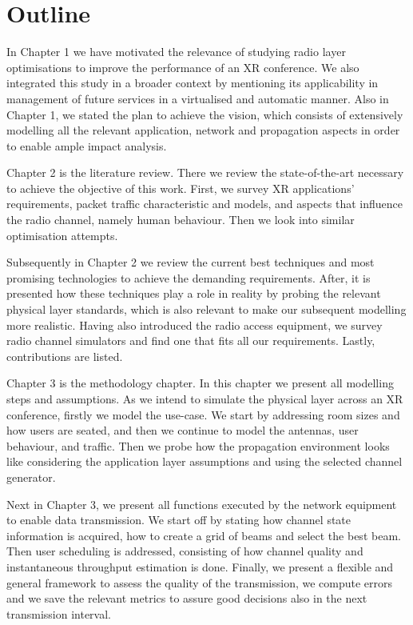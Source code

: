\section{Outline}
\label{sec:outline}

In Chapter 1 we have motivated the relevance of studying radio layer optimisations to improve the performance of an \ac{XR} conference. We also integrated this study in a broader context by mentioning its applicability in management of future services in a virtualised and automatic manner. Also in Chapter 1, we stated the plan to achieve the vision, which consists of extensively modelling all the relevant application, network and propagation aspects in order to enable ample impact analysis. 

Chapter 2 is the literature review. There we review the state-of-the-art necessary to achieve the objective of this work. First, we survey XR applications' requirements, packet traffic characteristic and models, and aspects that influence the radio channel, namely human behaviour. Then we look into similar optimisation attempts. 

Subsequently in Chapter 2 we review the current best techniques and most promising technologies to achieve the demanding requirements. After, it is presented how these techniques play a role in reality by probing the relevant physical layer standards, which is also relevant to make our subsequent modelling more realistic. Having also introduced the radio access equipment, we survey radio channel simulators and find one that fits all our requirements. Lastly, contributions are listed.

Chapter 3 is the methodology chapter. In this chapter we present all modelling steps and assumptions. As we intend to simulate the physical layer across an XR conference, firstly we model the use-case. We start by addressing room sizes and how users are seated, and then we continue to model the antennas, user behaviour, and traffic. Then we probe how the propagation environment looks like considering the application layer assumptions and using the selected channel generator.

Next in Chapter 3, we present all functions executed by the network equipment to enable data transmission. We start off by stating how channel state information is acquired, how to create a grid of beams and select the best beam. Then user scheduling is addressed, consisting of how channel quality and instantaneous throughput estimation is done. Finally, we present a flexible and general framework to assess the quality of the transmission, we compute errors and we save the relevant metrics to assure good decisions also in the next transmission interval.

